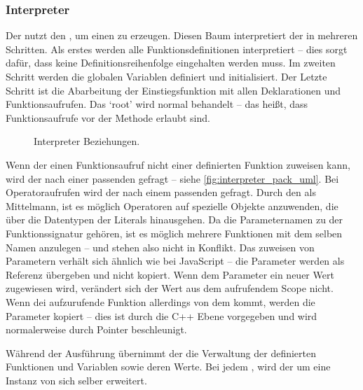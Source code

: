     \subsubsection{Interpreter}
    \label{sssec:Interpreter}
      Der  nutzt den , um einen  zu erzeugen. Diesen Baum interpretiert der  in mehreren Schritten. Als erstes werden alle Funktionsdefinitionen interpretiert -- dies sorgt dafür, dass keine Definitionsreihenfolge eingehalten werden muss. Im zweiten Schritt werden die globalen Variablen definiert und initialisiert. Der Letzte Schritt ist die Abarbeitung der Einstiegsfunktion mit allen Deklarationen und Funktionsaufrufen. Das `root'  wird normal behandelt -- das heißt, dass Funktionsaufrufe vor der  Methode erlaubt sind.
      \begin{figure}[H]
        \centering
        \caption{Interpreter Beziehungen.}
        \label{fig:interpreter_pack_uml}
      \end{figure}

      Wenn der  einen Funktionsaufruf nicht einer definierten Funktion zuweisen kann, wird der  nach einer passenden  gefragt -- siehe \autoref{fig:interpreter_pack_uml}. Bei Operatoraufrufen wird der  nach einem passenden  gefragt. Durch den  als Mittelmann, ist es möglich Operatoren auf spezielle Objekte anzuwenden, die über die Datentypen der Literals hinausgehen. Da die Parameternamen zu der Funktionssignatur gehören, ist es möglich mehrere Funktionen mit dem selben Namen anzulegen --  und  stehen also nicht in Konflikt. Das zuweisen von Parametern verhält sich ähnlich wie bei JavaScript -- die Parameter werden als Referenz übergeben und nicht kopiert. Wenn dem Parameter ein neuer Wert zugewiesen wird, verändert sich der Wert aus dem aufrufendem Scope nicht. Wenn dei aufzurufende Funktion allerdings von dem  kommt, werden die Parameter kopiert -- dies ist durch die C++ Ebene vorgegeben und wird normalerweise durch Pointer beschleunigt.

      Während der Ausführung übernimmt der  die Verwaltung der definierten Funktionen und Variablen sowie deren Werte. Bei jedem , wird der  um eine Instanz von sich selber erweitert.

